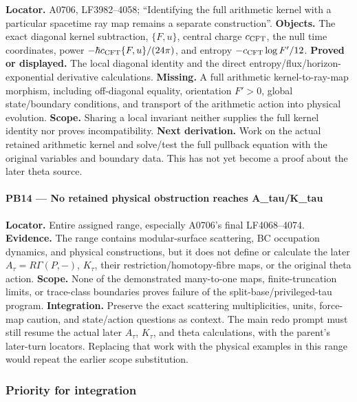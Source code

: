 \documentclass[10pt,a4paper,oneside]{report}
\begin{document}
\textbf{Locator.} A0706, LF3982--4058; ``Identifying the full arithmetic
kernel with a particular spacetime ray map remains a separate
construction''. \textbf{Objects.} The exact diagonal kernel subtraction,
\(\{F,u\}\), central charge \(c_{\rm CFT}\), the null time coordinates,
power \(-\hbar c_{\rm CFT}\{F,u\}/(24\pi)\), and entropy
\(-c_{\rm CFT}\log F'/12\). \textbf{Proved or displayed.} The local
diagonal identity and the direct entropy/flux/horizon-exponential
derivative calculations. \textbf{Missing.} A full arithmetic
kernel-to-ray-map morphism, including off-diagonal equality, orientation
\(F'>0\), global state/boundary conditions, and transport of the
arithmetic action into physical evolution. \textbf{Scope.} Sharing a
local invariant neither supplies the full kernel identity nor proves
incompatibility. \textbf{Next derivation.} Work on the actual retained
arithmetic kernel and solve/test the full pullback equation with the
original variables and boundary data. This has not yet become a proof
about the later theta source.

\paragraph{PB14 --- No retained physical obstruction reaches
A\_tau/K\_tau}\label{pb14-no-retained-physical-obstruction-reaches-a_tauk_tau}

\textbf{Locator.} Entire assigned range, especially A0706's final
LF4068--4074. \textbf{Evidence.} The range contains modular-surface
scattering, BC occupation dynamics, and physical constructions, but it
does not define or calculate the later \(A_\tau=R\Gamma(P,-)\),
\(K_\tau\), their restriction/homotopy-fibre maps, or the original theta
action. \textbf{Scope.} None of the demonstrated many-to-one maps,
finite-truncation limits, or trace-class boundaries proves failure of
the split-base/privileged-tau program. \textbf{Integration.} Preserve
the exact scattering multiplicities, units, force-map caution, and
state/action questions as context. The main redo prompt must still
resume the actual later \(A_\tau\), \(K_\tau\), and theta calculations,
with the parent's later-turn locators. Replacing that work with the
physical examples in this range would repeat the earlier scope
substitution.

\subsubsection{Priority for integration}\label{priority-for-integration}
\end{document}
